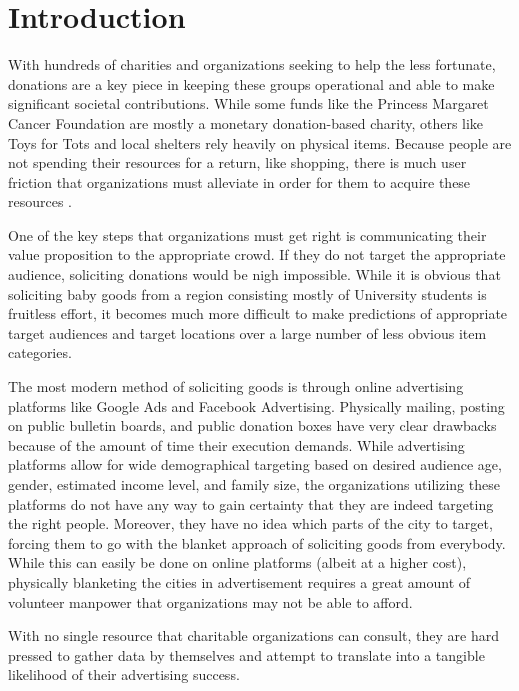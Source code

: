 \documentclass[12pt]{article}
\begin{document}
\newpage
\section{Introduction}

With hundreds of charities and organizations seeking to help the less fortunate, donations are a key piece in keeping these groups operational and able to make significant societal contributions. While some funds like the Princess Margaret Cancer Foundation are mostly a monetary donation-based charity, others like Toys for Tots and local shelters rely heavily on physical items. Because people are not spending their resources for a return, like shopping, there is much user friction that organizations must alleviate in order for them to acquire these resources \cite{npwd}. 

One of the key steps that organizations must get right is communicating their value proposition to the appropriate crowd. If they do not target the appropriate audience, soliciting donations would be nigh impossible. While it is obvious that soliciting baby goods from a region consisting mostly of University students is fruitless effort, it becomes much more difficult to make predictions of appropriate target audiences and target locations over a large number of less obvious item categories. 

The most modern method of soliciting goods is through online advertising platforms like Google Ads and Facebook Advertising. Physically mailing, posting on public bulletin boards, and public donation boxes have very clear drawbacks because of the amount of time their execution demands. While advertising platforms allow for wide demographical targeting based on desired audience age, gender, estimated income level, and family size, the organizations utilizing these platforms do not have any way to gain certainty that they are indeed targeting the right people. Moreover, they have no idea which parts of the city to target, forcing them to go with the blanket approach of soliciting goods from everybody. While this can easily be done on online platforms (albeit at a higher cost), physically blanketing the cities in advertisement requires a great amount of volunteer manpower that organizations may not be able to afford. 

With no single resource that charitable organizations can consult, they are hard pressed to gather data by themselves and attempt to translate into a tangible likelihood of their advertising success. 
\end{document}
